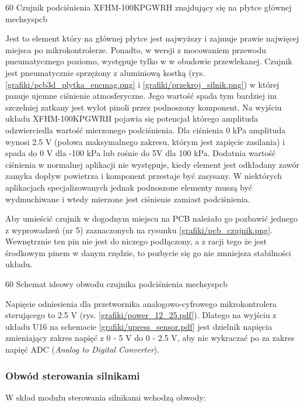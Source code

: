 	{60}
	{Czujnik podciśnienia XFHM-100KPGWRH znajdujący się na płytce głównej}
	{mechsyspcb}

Jest to element który na głównej płytce jest najwyższy i zajmuje prawie najwięcej miejsca po mikrokontrolerze. Ponadto, w wersji z mocowaniem przewodu pneumatycznego poziomo, występuje tylko w w obudowie przewlekanej. Czujnik jest pneumatycznie sprzężony z aluminiową kostką (rys. \ref{grafiki/pcb3d_plytka_encmag.png} i \ref{grafiki/przekroj_silnik.png}) w której panuje ujemne ciśnienie atmosferyczne. Jego wartość spada tym bardziej im szczelniej zatkany jest wylot pinoli przez podnoszony komponent. Na wyjściu układu XFHM-100KPGWRH pojawia się potencjał którego amplituda odzwierciedla wartość mierzonego podciśnienia. Dla ciśnienia 0 kPa amplituda wynosi 2.5 V (połowa maksymalnego zakresu, którym jest zapięcie zasilania) i spada do 0 V dla -100 kPa lub rośnie do 5V dla 100 kPa. Dodatnia wartość ciśnienia w normalnej aplikacji nie występuje, kiedy element jest odkładany zawór zamyka dopływ powietrza i komponent przestaje być zasysany. W niektórych aplikacjach specjalizowanych jednak podnoszone elementy muszą być wydmuchiwane i wtedy mierzone jest ciśnienie zamiast podciśnienia.

Aby umieścić czujnik w dogodnym miejscu na PCB należało go pozbawić jednego z wyprowadzeń (nr 5) zaznaczonych na rysunku \ref{grafiki/pcb_czujnik.png}. Wewnętrznie ten pin nie jest do niczego podłączony, a z racji tego że jest środkowym pinem w danym rzędzie, to pozbycie się go nie zmniejsza stabilności układu.

	{60}
	{Schemat ideowy obwodu czujnika podciśnienia}
	{mechsyspcb}

Napięcie odniesienia dla przetwornika analogowo-cyfrowego mikrokontrolera sterującego to 2.5 V (rys. \ref{grafiki/power_12_25.pdf}). Dlatego na wyjściu z układu U16 na schemacie \ref{grafiki/upress_sensor.pdf} jest dzielnik napięcia zmieniający zakres napięć z 0 - 5 V do 0 - 2.5 V, aby nie wykraczać po za zakres napięć ADC ({\it Analog to Digital Converter}).

\subsubsection{Obwód sterowania silnikami}
\label{sss:sterowanie_silnikami}

W skład modułu sterowania silnikami wchodzą obwody: \\

